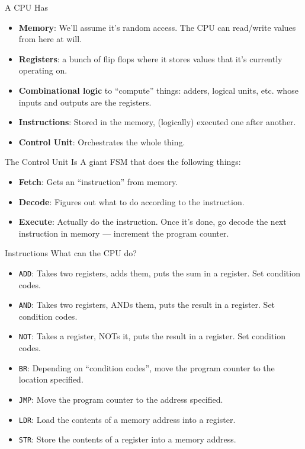 \documentclass[aspectratio=169, 11pt, handout]{beamer}
\begin{document}
\begin{frame}{A CPU Has}
\pause
    \begin{itemize}
        \item \textbf{Memory}: We'll assume it's random access. The CPU can read/write values from here at will.\pause
        \item \textbf{Registers}: a bunch of flip flops where it stores values that it's currently operating on.\pause
        \item \textbf{Combinational logic} to ``compute'' things: adders, logical units, etc. whose inputs and outputs are the registers.\pause
        \item \textbf{Instructions}: Stored in the memory, (logically) executed one after another.\pause
        \item \textbf{Control Unit}: Orchestrates the whole thing.
    \end{itemize}
\end{frame}

\begin{frame}{The Control Unit Is}
    A giant FSM that does the following things:\pause
    \begin{itemize}
        \item \textbf{Fetch}: Gets an ``instruction'' from memory.\pause
        \item \textbf{Decode}: Figures out what to do according to the instruction.\pause
        \item \textbf{Execute}: Actually do the instruction. Once it's done, go decode the next instruction in memory --- increment the program counter.
    \end{itemize}
    
\end{frame}


\begin{frame}{Instructions}
    What can the CPU do?
    \begin{itemize}
        \item \texttt{ADD}: Takes two registers, adds them, puts the sum in a register. Set condition codes.\pause
        \item \texttt{AND}: Takes two registers, ANDs them, puts the result in a register. Set condition codes.\pause
        \item \texttt{NOT}: Takes a register, NOTs it, puts the result in a register. Set condition codes.\pause
        \item \texttt{BR}: Depending on ``condition codes'', move the program counter to the location specified.\pause
        \item \texttt{JMP}: Move the program counter to the address specified.\pause
        \item \texttt{LDR}: Load the contents of a memory address into a register.\pause
        \item \texttt{STR}: Store the contents of a register into a memory address.
    \end{itemize}
\end{frame}
\end{document}

